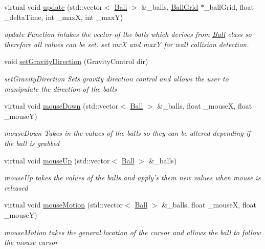 \begin{DoxyCompactItemize}
\item 
virtual void \hyperlink{classBallControl_af32a9b232b26af69231966ae3aab98d5}{update} (std::vector$<$ \hyperlink{structBall}{Ball} $>$ \&\_\-balls, \hyperlink{classBallGrid}{BallGrid} $\ast$\_\-ballGrid, float \_\-deltaTime, int \_\-maxX, int \_\-maxY)
\begin{DoxyCompactList}\small\item\em update Function intakes the vector of the balls which derives from \hyperlink{structBall}{Ball} class so therefore all values can be set. set mxX and maxY for wall collision detection. \item\end{DoxyCompactList}\item 
void \hyperlink{classBallControl_afa0b3f2735a09bd485ff70ce76ba0ec4}{setGravityDirection} (GravityControl dir)
\begin{DoxyCompactList}\small\item\em setGravityDirection Sets gravity direction control and allows the user to manipulate the direction of the balls \item\end{DoxyCompactList}\item 
virtual void \hyperlink{classBallControl_a1ba25b7c58a9a6ec39ca54daa9e1f488}{mouseDown} (std::vector$<$ \hyperlink{structBall}{Ball} $>$ \&\_\-balls, float \_\-mouseX, float \_\-mouseY)
\begin{DoxyCompactList}\small\item\em mouseDown Takes in the values of the balls so they can be altered depending if the ball is grabbed \item\end{DoxyCompactList}\item 
virtual void \hyperlink{classBallControl_adbc3a6859b147973570a0a531942e595}{mouseUp} (std::vector$<$ \hyperlink{structBall}{Ball} $>$ \&\_\-balls)
\begin{DoxyCompactList}\small\item\em mouseUp takes the values of the balls and apply's them new values when mouse is released \item\end{DoxyCompactList}\item 
virtual void \hyperlink{classBallControl_a18a2fcfe219f8f28319d8f9dcb2bee77}{mouseMotion} (std::vector$<$ \hyperlink{structBall}{Ball} $>$ \&\_\-balls, float \_\-mouseX, float \_\-mouseY)
\begin{DoxyCompactList}\small\item\em mouseMotion takes the general location of the cursor and allows the ball to follow the mouse cursor \item\end{DoxyCompactList}\item 

\end{DoxyCompactItemize}
